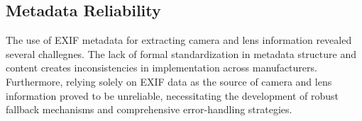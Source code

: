 \subsection{Metadata Reliability}

The use of EXIF metadata for extracting camera and lens information revealed several challegnes. The lack of formal standardization in metadata structure and content creates inconsistencies in implementation across manufacturers. Furthermore, relying solely on EXIF data as the source of camera and lens information proved to be unreliable, necessitating the development of robust fallback mechanisms and comprehensive error-handling strategies.